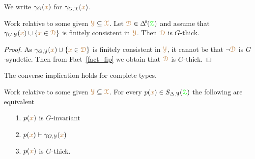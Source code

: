 We write $\gamma_G({\color{brown} x})$ for $\gamma_{G,\EuScript X}({\color{brown} x})$.


\begin{corollary}\label{corol_q_pers}
  Work relative to some given ${\color{brown}\EuScript Y}\subseteq{\color{brown}\EuScript X}$.
  Let $\mrD\in\BDelta(\grZ)$ and assume that $\gamma_{G,\EuScript Y}({\color{brown} x})\cup\{{\color{brown} x}\in{\color{brown}\EuScript D}\}$ is finitely consistent in ${\color{brown}\EuScript Y}$.
  Then ${\color{brown}\EuScript D}$ is $G$-thick.
\end{corollary}

\begin{proof}
  As $\gamma_{G,\EuScript Y}({\color{brown} x})\cup\{{\color{brown} x}\in{\color{brown}\EuScript D}\}$ is finitely consistent in ${\color{brown}\EuScript Y}$, it cannot be that $\neg{\color{brown}\EuScript D}$ is $G$-syndetic.
  Then from Fact~\ref{fact_fip} we obtain that ${\color{brown}\EuScript D}$ is $G$-thick.
\end{proof}

The converse implication holds for complete types.

\begin{theorem}\label{thm_syndetic_invariant}
  Work relative to some given ${\color{brown}\EuScript Y}\subseteq{\color{brown}\EuScript X}$.
  For every $p({\color{brown} x})\in S_{\Delta,\EuScript Y}({\color{green}\EuScript Z})$ the following are equivalent
  \begin{itemize}
    \item[1.] $p({\color{brown} x})$ is $G$-invariant
    \item[2.] $p({\color{brown} x})\vdash\gamma_{G,\EuScript Y}({\color{brown} x})$
    \item[3.] $p({\color{brown} x})$ is $G$-thick.
  \end{itemize}
\end{theorem}

